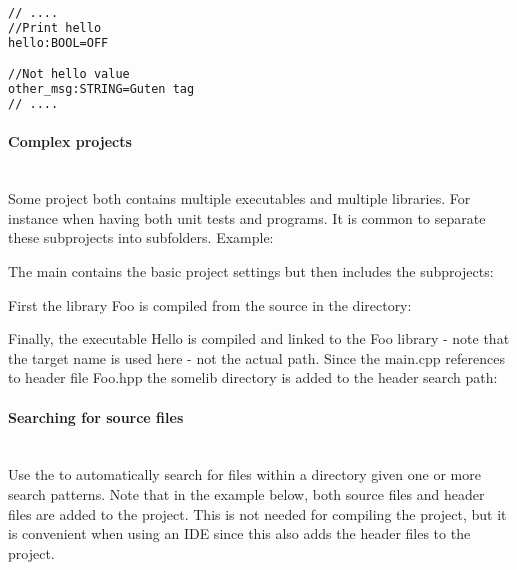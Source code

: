 \documentclass[11pt,a4paper,landscape]{scrartcl} %
\newcommand{\sectiontitle}[1]{\paragraph{#1} \ \\} %
\begin{document}
\begin{multicols}{2}
\begin{lstlisting}[language=bash]
// ....
//Print hello
hello:BOOL=OFF

//Not hello value
other_msg:STRING=Guten tag
// ....
\end{lstlisting}

\sectiontitle{Complex projects}

Some project both contains multiple executables and multiple libraries. For instance when having both unit tests and programs. It is common to separate these subprojects into subfolders. Example:

\vspace{\baselineskip} %
\noindent{}

\vspace{\baselineskip} %

The main  contains the basic project settings but then includes the subprojects:



First the library Foo is compiled from the source in the   directory:



Finally, the executable Hello is compiled and linked to the Foo library - note that the target name is used here - not the actual path. Since the main.cpp references to header file Foo.hpp the somelib directory is added to the header search path:



\sectiontitle{Searching for source files}

Use the  to automatically search for files within a directory given one or more search patterns. Note that in the example below, both source files and header files are added to the project. This is not needed for compiling the project, but it is convenient when using an IDE since this also adds the header files to the project.


\end{multicols}
\end{document}

